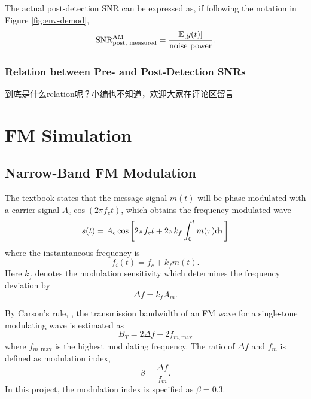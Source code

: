 \documentclass[../ECE459FinalProjectReport.tex]{subfiles}
\begin{document}
The actual post-detection SNR can be expressed as, if following the notation in Figure \ref{fig:env-demod},
\begin{equation}
    \text{SNR}_{\text{post, measured}}^{\text{AM}} = \frac{\mathbb{E}[y(t)]}{\text{noise power}}.
\end{equation}


\subsubsection{Relation between Pre- and Post-Detection SNRs}
到底是什么relation呢？小编也不知道，欢迎大家在评论区留言

\section{FM Simulation}
\subsection{Narrow-Band FM Modulation}
The textbook \cite[Sec. 4.1]{haykinIntroductionAnalogDigital2007} states that the message signal $m(t)$ will be phase-modulated with a carrier signal $A_c \cos(2\pi f_c t)$, which obtains the frequency modulated wave
\begin{equation}
    s(t) = A_c \cos\left[ 2\pi f_c t + 2\pi k_f \int_0^{t} m(\tau) \mathrm{d}\tau \right]
\end{equation}
where the instantaneous frequency is
\begin{equation}
    f_i(t) = f_c + k_f m(t).
\end{equation}
Here $k_f$ denotes the modulation sensitivity which determines the frequency deviation by
\begin{equation}
    \Delta f = k_f A_m.
\end{equation}

By Carson's rule, \cites[Sec. 4.6]{haykinIntroductionAnalogDigital2007}{CarsonRule2017}, the transmission bandwidth of an FM wave for a single-tone modulating wave is estimated as
\begin{equation}
    B_T = 2\Delta f + 2f_{m,\mathrm{max}}
\end{equation}
where $f_{m,\mathrm{max}}$ is the highest modulating frequency. The ratio of $\Delta f$ and $f_m$ is defined as modulation index,
\begin{equation}
    \beta = \frac{\Delta f}{f_m}.
\end{equation}
In this project, the modulation index is specified as $\beta=0.3$.
\end{document}
